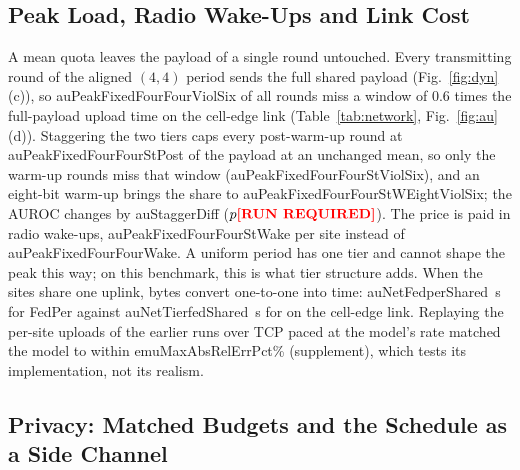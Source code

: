 \subsection{Peak Load, Radio Wake-Ups and Link Cost}
\label{sec:results-net}
\label{sec:results-emu}
\begin{table}[t]
\caption{Peak load, wake-ups and link cost on the specialty sites (MLP, means over seeds): upload over 60 rounds; $\hat P$, $v(W)$ at $W=0.6$ times the full-payload upload time on the cell-edge link, and $u_k$ of (\ref{eq:netmetrics}); communication time with independent links ($t$) and one shared uplink ($t_{\mathrm{sh}}$), (\ref{eq:netcost}); uplink transmit energy $E$}
\label{tab:network}
\centering\footnotesize
{}
\end{table}

A mean quota leaves the payload of a single round untouched. Every transmitting round of the aligned $(4,4)$ period sends the full shared payload (Fig.~\ref{fig:dyn}(c)), so \num{auPeakFixedFourFourViolSix} of all rounds miss a window of 0.6 times the full-payload upload time on the cell-edge link (Table~\ref{tab:network}, Fig.~\ref{fig:au}(d)). Staggering the two tiers caps every post-warm-up round at \num{auPeakFixedFourFourStPost} of the payload at an unchanged mean, so only the warm-up rounds miss that window (\num{auPeakFixedFourFourStViolSix}), and an eight-bit warm-up brings the share to \num{auPeakFixedFourFourStWEightViolSix}; the AUROC changes by \num{auStaggerDiff} ($p\num{auStaggerP}$). The price is paid in radio wake-ups, \num{auPeakFixedFourFourStWake} per site instead of \num{auPeakFixedFourFourWake}. A uniform period has one tier and cannot shape the peak this way; on this benchmark, this is what tier structure adds. When the sites share one uplink, bytes convert one-to-one into time: \num{auNetFedperShared}~s for FedPer against \num{auNetTierfedShared}~s for \tierfed{} on the cell-edge link. Replaying the per-site uploads of the earlier runs over TCP paced at the model's rate matched the model to within \num{emuMaxAbsRelErrPct}\% (supplement), which tests its implementation, not its realism.

\subsection{Privacy: Matched Budgets and the Schedule as a Side Channel}
\label{sec:results-privacy}

\begin{table}[t]
\caption{Matched privacy at $\varepsilon^\star=4$, $\delta=10^{-5}$, $q=1$, $C=1$ (6 seeds), $z$ calibrated to each method's release count: share of updates clipped, $A^{\mathcal T}(\hat r)$, $\hat r$ and final-round AUROC; local training spends $\varepsilon=0$}
\label{tab:dp}
\centering\footnotesize
{}
\end{table}

